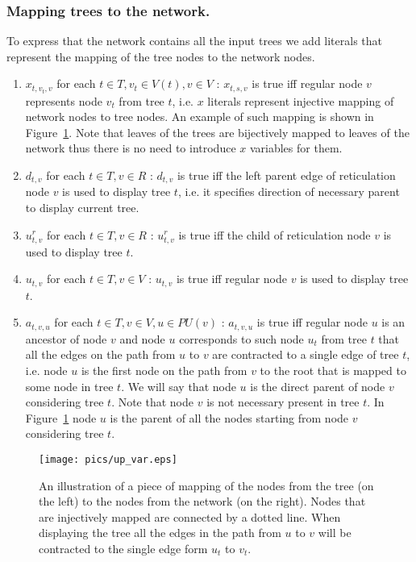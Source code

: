 \documentclass[runningheads, envcountsame, a4paper]{llncs}
\begin{document}
\subsubsection{Mapping trees to the network.}

To express that the network contains all the input trees we add literals that represent the mapping of the tree nodes to 
the network nodes.

\begin{enumerate}

\item $x_{t,v_t,v}$ for each $t \in T, v_t \in V(t), v \in V$ :
$x_{t,s,v}$ is true iff regular node $v$ represents node $v_t$ from tree $t$, i.e. $x$ literals represent injective 
mapping of network nodes to tree nodes. An example of such mapping is shown in Figure~\ref{mapping-example}.
Note that leaves of the trees are bijectively mapped to leaves of the network thus there is no need to introduce $x$ variables for them.

\item $d_{t,v}$ for each $t \in T, v \in R$ :
$d_{t,v}$ is true iff the left parent edge of reticulation node $v$ is used to display tree $t$,
 i.e. it specifies direction of necessary parent to display current tree.

\item $u^r_{t,v}$ for each $t \in T, v \in R$ :
$u^r_{t,v}$ is true iff the child of reticulation node $v$ is used to display tree $t$.

\item $u_{t,v}$ for each $t \in T, v \in V$ :
$u_{t,v}$ is true iff regular node $v$ is used to display tree $t$.

\item $a_{t,v,u}$ for each $t \in T, v \in V, u \in PU(v)$ :
$a_{t,v,u}$ is true iff regular node $u$ is an ancestor of node $v$ and node $u$ corresponds to such node $u_t$ 
from tree $t$ that all the edges on the path from $u$ to $v$ are contracted to a single edge of tree $t$, i.e. node
$u$ is the first node on the path from $v$ to the root that is mapped to some node in tree $t$.
We will say that node $u$ is the direct parent of node $v$ considering tree $t$. Note that node $v$ is not necessary present in tree $t$.
In Figure~\ref{mapping-example} node $u$ is the parent of all the nodes starting from node $v$ considering tree $t$.

\end{enumerate}

\begin{figure}[t]
  \centering
  \texttt{[image: pics/up\_var.eps]}
  \caption{An illustration of a piece of mapping of the nodes from the tree (on the left) to the nodes from the network (on the right). 
  Nodes that are injectively mapped are connected by a dotted line. When displaying the tree all the edges in the path from $u$ to $v$
  will be contracted to the single edge form $u_t$ to $v_t$.}
  \label{mapping-example}
\end{figure}
\end{document}
